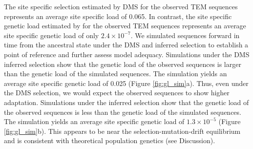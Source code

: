\documentclass[12pt]{article}
\begin{document}
The site specific selection estimated by DMS for the observed TEM sequences represents an average site specific load of 0.065.
In contrast, the site specific genetic load estimated by \selac for the observed TEM sequences represents an average site specific genetic load of only $2.4\times 10^{-7}$.
We simulated sequences forward in time from the ancestral state under the DMS and \selac inferred selection to establish a point of reference and further assess model adequacy.
Simulations under the DMS inferred selection show that the genetic load of the observed sequences is larger than the genetic load of the simulated sequences.
The simulation yields an average site specific genetic load of 0.025 (Figure \ref{fig:gl_sim}a).
Thus, even under the DMS selection, we would expect the observed sequences to show higher adaptation.
Simulations under the \selac inferred selection show that the genetic load of the observed sequences is less than the genetic load of the simulated sequences.
The simulation yields an average site specific genetic load of $1.3 \times 10^{-5}$ (Figure \ref{fig:gl_sim}b).
This appears to be near the selection-mutation-drift equilibrium and is consistent with theoretical population genetics (see Discussion).
\end{document}
